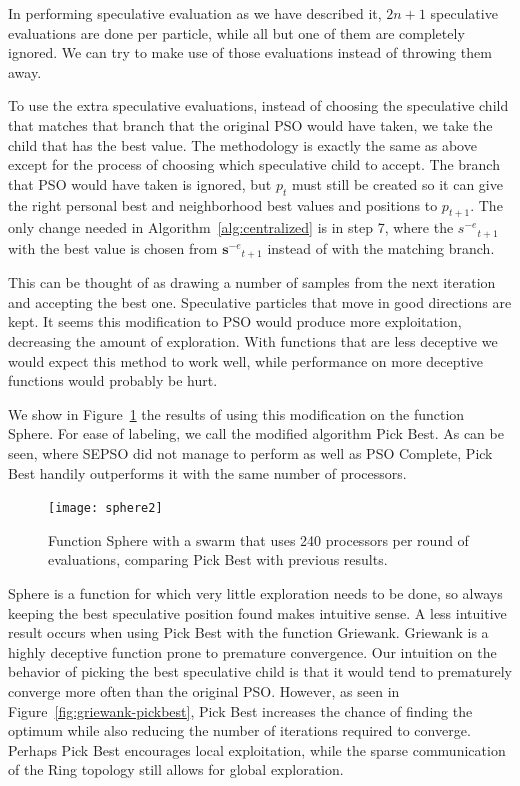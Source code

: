 \documentclass[journal,letterpaper]{IEEEtran}
\newcommand{\fig}[1]{Figure~\ref{fig:#1}}
\newcommand{\alg}[1]{Algorithm~\ref{alg:#1}}
\providecommand{\noeval}[1]{\ensuremath{#1^{-e}}}
\providecommand{\p}{\ensuremath{p}}
\providecommand{\s}{\ensuremath{s}}
\providecommand{\sset}{\ensuremath{\mathbf{s}}}
\begin{document}
In performing speculative evaluation as we have described it, $2n+1$
speculative evaluations are done per particle, while all but one of them are
completely ignored.  We can try to make use of those evaluations instead of
throwing them away.  

To use the extra speculative evaluations, instead of choosing the speculative
child that matches that branch that the original PSO would have taken, we take
the child that has the best value.  The methodology is exactly the same as
above except for the process of choosing which speculative child to accept.
The branch that PSO would have taken is ignored, but $\p_t$ must still be
created so it can give the right personal best and neighborhood best values and
positions to $\p_{t+1}$.  The only change needed in \alg{centralized} is in
step 7, where the $\noeval{\s}_{t+1}$ with the best value is chosen from
$\noeval{\sset}_{t+1}$ instead of with the matching branch.

This can be thought of as drawing a number of samples from the next iteration
and accepting the best one.  Speculative particles that move in good directions
are kept.  It seems this modification to PSO would produce more exploitation,
decreasing the amount of exploration.  With functions that are less deceptive
we would expect this method to work well, while performance on more deceptive
functions would probably be hurt.

We show in \fig{sphere-pickbest} the results of using this modification on the
function Sphere.  For ease of labeling, we call the modified algorithm Pick
Best.  As can be seen, where SEPSO did not manage to perform as well as PSO
Complete, Pick Best handily outperforms it with the same number of processors.

\begin{figure}
  \centering
  \texttt{[image: sphere2]}
  \caption{Function Sphere with a swarm that uses 240 processors per round of
  evaluations, comparing Pick Best with previous results.}
  \label{fig:sphere-pickbest}
\end{figure}

Sphere is a function for which very little exploration needs to be done, so
always keeping the best speculative position found makes intuitive sense.  A
less intuitive result occurs when using Pick Best with the function Griewank.
Griewank is a highly deceptive function prone to premature convergence.  Our
intuition on the behavior of picking the best speculative child is that it
would tend to prematurely converge more often than the original PSO.  However,
as seen in \fig{griewank-pickbest}, Pick Best increases the chance of finding
the optimum while also reducing the number of iterations required to converge.
Perhaps Pick Best encourages local exploitation, while the sparse communication
of the Ring topology still allows for global exploration.
\end{document}
